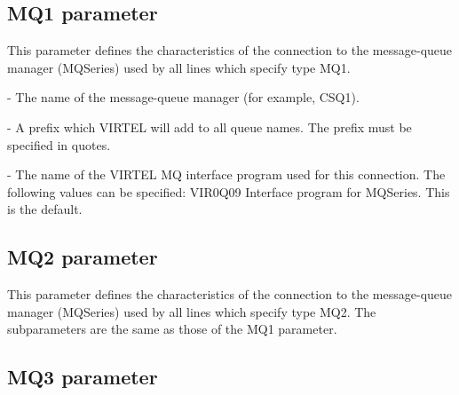 \documentclass[letterpaper,10pt,english]{sphinxmanual}
\begin{document}
\subsection{MQ1 parameter}
\label{\detokenize{Installation_Guide:mq1-parameter}}
\begin{sphinxVerbatim}[commandchars=\\\{\}]
\PYG{p}{[}\PYG{p}{]}           
\end{sphinxVerbatim}

This parameter defines the characteristics of the connection to the message-queue manager (MQSeries) used by all lines which specify type MQ1.

 - The name of the message-queue manager (for example, CSQ1).

 - A prefix which VIRTEL will add to all queue names. The prefix must be specified in quotes.

 - The name of the VIRTEL MQ interface program used for this connection. The following values can be specified: VIR0Q09 Interface program for MQSeries. This is the default.


\subsection{MQ2 parameter}
\label{\detokenize{Installation_Guide:mq2-parameter}}
\begin{sphinxVerbatim}[commandchars=\\\{\}]
\PYG{p}{[}\PYG{p}{]}             
\end{sphinxVerbatim}

This parameter defines the characteristics of the connection to the message-queue manager (MQSeries) used by all lines which specify type MQ2. The subparameters are the same as those of the MQ1 parameter.


\subsection{MQ3 parameter}
\label{\detokenize{Installation_Guide:mq3-parameter}}
\begin{sphinxVerbatim}[commandchars=\\\{\}]
\PYG{p}{[}\PYG{p}{]}             
\end{sphinxVerbatim}
\end{document}
